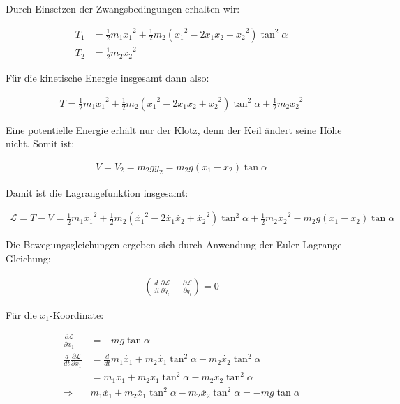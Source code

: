 \documentclass[a4paper,german,12pt,smallheadings]{scrartcl}
\begin{document}
Durch Einsetzen der Zwangsbedingungen erhalten wir:

\begin{align*}
  T_1 &= \frac{1}{2}m_1\dot{x_1}^2 + \frac{1}{2}m_2 (\dot{x_1}^2 - 2\dot{x_1}\dot{x_2}+\dot{x_2}^2) \tan^2 \alpha \\
  T_2 &= \frac{1}{2} m_2 \dot{x_2}^2
\end{align*}

Für die kinetische Energie insgesamt dann also:

\begin{align*}
  T = \frac{1}{2}m_1\dot{x_1}^2 + \frac{1}{2}m_2 (\dot{x_1}^2 - 2\dot{x_1}\dot{x_2}+\dot{x_2}^2) \tan^2 \alpha + \frac{1}{2} m_2 \dot{x_2}^2
\end{align*}

Eine potentielle Energie erhält nur der Klotz, denn der Keil ändert seine Höhe nicht. Somit ist:

\begin{align*}
  V = V_2 = m_2gy_2 = m_2g (x_1 - x_2) \tan \alpha
\end{align*}

Damit ist die Lagrangefunktion insgesamt:

\begin{align*}
  \mathcal{L} = T -V = \frac{1}{2}m_1\dot{x_1}^2 + \frac{1}{2} m_2 (\dot{x_1}^2 - 2\dot{x_1}\dot{x_2}+\dot{x_2}^2) \tan^2 \alpha + \frac{1}{2} m_2 \dot{x_2}^2 - m_2g (x_1 - x_2) \tan \alpha
\end{align*}

Die Bewegungsgleichungen ergeben sich durch Anwendung der Euler-Lagrange-Gleichung:

\begin{align*}
  \left(\frac{d}{dt}\frac{\partial \mathcal{L}}{\partial \dot{q_i}} - \frac{\partial \mathcal{L}}{\partial q_i}\right)= 0
\end{align*}

Für die $x_1$-Koordinate:

\begin{align*}
  \frac{\partial \mathcal{L}}{\partial x_1} &= -mg \tan \alpha \\
  \frac{d}{dt}\frac{\partial \mathcal{L}}{\partial \dot{x_1}} &= \frac{d}{dt} m_1 \dot{x_1} + m_2\dot{x_1}\tan^2 \alpha - m_2\dot{x_2} \tan^2 \alpha \\
                                                  &= m_1\ddot{x_1} + m_2 \ddot{x_1} \tan^2 \alpha - m_2 \ddot{x_2} \tan^2 \alpha \\
  \Rightarrow\quad &m_1\ddot{x_1} + m_2 \ddot{x_1} \tan^2 \alpha - m_2 \ddot{x_2} \tan^2 \alpha = -mg \tan \alpha
\end{align*}
\end{document}
